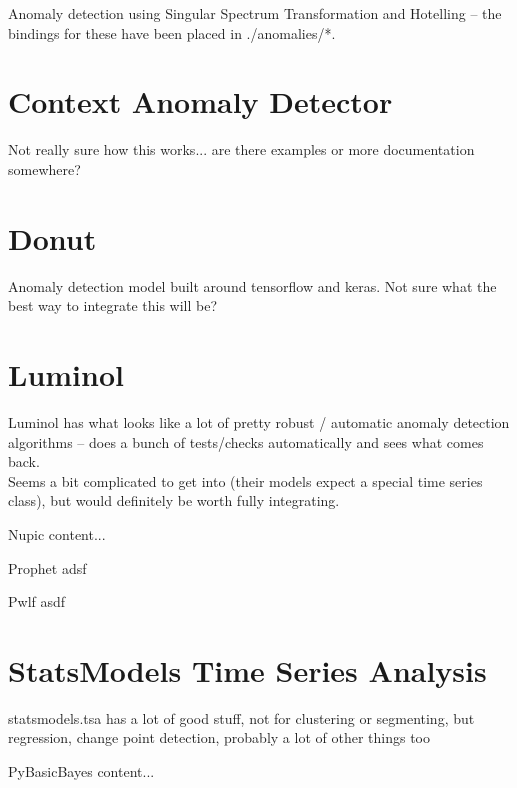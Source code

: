 \documentclass[10pt,a4paper]{report}
\begin{document}
Anomaly detection using Singular Spectrum Transformation and Hotelling -- the bindings for these have been placed in ./anomalies/*.



\section{Context Anomaly Detector}
Not really sure how this works... are there examples or more documentation somewhere?


\section{Donut}
Anomaly detection model built around tensorflow and keras. Not sure what the best way to integrate this will be?



\section{Luminol}
Luminol has what looks like a lot of pretty robust / automatic anomaly detection algorithms -- does a bunch of tests/checks automatically and sees what comes back.\\

Seems a bit complicated to get into (their models expect a special time series class), but would definitely be worth fully integrating. 



\begin{section}{Nupic}
	content...
\end{section}

\begin{section}{Prophet}
	adsf	
\end{section}

\begin{section}{Pwlf}
	asdf
\end{section}

\section{StatsModels Time Series Analysis}

statsmodels.tsa has a lot of good stuff, not for clustering or segmenting, but regression, change point detection, probably a lot of other things too



\begin{section}{PyBasicBayes}
	content...
\end{section}
\end{document}

